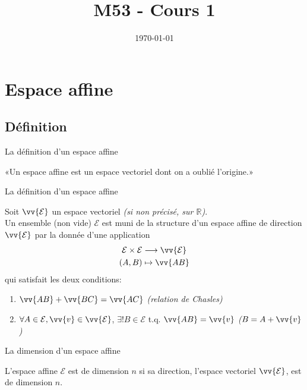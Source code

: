 \documentclass[aspectratio=1610 %
]{beamer}
\title{M53 - Cours 1}
\date{\today}
\newcommand{\myemph}[1]{\textcolor{green!70!black}{\emph{#1}}}
\let\ens\mathcal
\begin{document}
\begin{frame}
  \titlepage
\end{frame}

\section{Espace affine}
\subsection{Définition}
\begin{frame}{La définition d'un espace affine}
  \begin{definition}[heuristique]
    «Un espace affine est un espace vectoriel dont on a oublié l'origine.»
  \end{definition}
\end{frame}
\begin{frame}{La définition d'un espace affine}
  \begin{definition}
    Soit $\vv{\ens{E}}$ un espace vectoriel \emph{(si non précisé, sur $\mathbb{R}$)}.\pause\\
    Un ensemble (non vide) $\ens{E}$ est muni de la structure d'un \alert{espace affine de direction $\vv{\ens{E}}$}
    par la donnée d'une application
    \begin{gather*}
      \ens{E} \times \ens{E} \longrightarrow \vv{\ens{E}}\\
      (A,B) \mapsto \vv{AB}
    \end{gather*}\pause
    qui satisfait les deux conditions:
    \begin{enumerate}[<+(1)->]
      \item $\vv{AB}+\vv{BC}=\vv{AC}$ \myemph{(relation de Chasles)}
      \item $\forall A \in \ens{E}, \vv{v} \in \vv{\ens{E}}$\pause , $\exists ! B \in \ens{E}$ t.q. $\vv{AB}=\vv{v}$
      \myemph{($B=A+\vv{v}$)}
    \end{enumerate}
  \end{definition}
\end{frame}
\begin{frame}{La dimension d'un espace affine}
  \begin{definition}
    L'espace affine $\ens{E}$ est de dimension $n$ si sa direction, l'espace vectoriel $\vv{\ens{E}}$, est de dimension $n$.
  \end{definition}
\end{frame}
\end{document}

